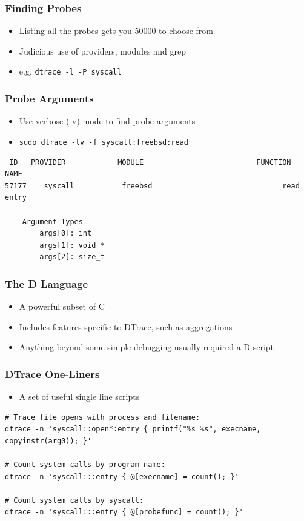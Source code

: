 \documentclass[pdftex]{beamer} %
\begin{document}
\begin{frame}[fragile]
  \frametitle{Finding Probes}
  \begin{itemize}
  \item Listing all the probes gets you $50000$ to choose from
  \item Judicious use of providers, modules and grep 
  \item e.g. \Verb+dtrace -l -P syscall+
  \end{itemize}
\end{frame}

\begin{frame}[fragile]
  \frametitle{Probe Arguments}
  \begin{itemize}
  \item Use verbose (-v) mode to find probe arguments
  \item \Verb+sudo dtrace -lv -f syscall:freebsd:read+
  \end{itemize}
\begin{verbatim}
 ID   PROVIDER            MODULE                          FUNCTION NAME
57177    syscall           freebsd                              read entry

	Argument Types
		args[0]: int
		args[1]: void *
		args[2]: size_t
\end{verbatim}
\end{frame}

\begin{frame}
  \frametitle{The D Language}
  \begin{itemize}
  \item A powerful subset of C
  \item Includes features specific to DTrace, such as aggregations
  \item Anything beyond some simple debugging usually required a D
    script
  \end{itemize}
\end{frame}

\begin{frame}[fragile]
  \frametitle{DTrace One-Liners}
  \begin{itemize}
  \item A set of useful single line scripts
  \end{itemize}
\begin{lstlisting}
# Trace file opens with process and filename:
dtrace -n 'syscall::open*:entry { printf("%s %s", execname, copyinstr(arg0)); }'

# Count system calls by program name:
dtrace -n 'syscall:::entry { @[execname] = count(); }'

# Count system calls by syscall:
dtrace -n 'syscall:::entry { @[probefunc] = count(); }'
\end{lstlisting}
\end{frame}
\end{document}
